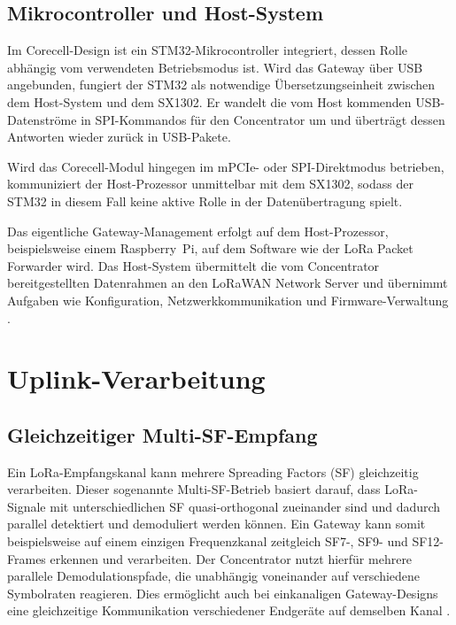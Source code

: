 \subsection{Mikrocontroller und Host-System}
	Im Corecell-Design ist ein STM32-Mikrocontroller integriert, dessen Rolle abhängig vom verwendeten Betriebsmodus ist. Wird das Gateway über USB angebunden, fungiert der STM32 als notwendige Übersetzungseinheit zwischen dem Host-System und dem SX1302. Er wandelt die vom Host kommenden USB-Datenströme in SPI-Kommandos für den Concentrator um und überträgt dessen Antworten wieder zurück in USB-Pakete. 

	Wird das Corecell-Modul hingegen im mPCIe- oder SPI-Direktmodus betrieben, kommuniziert der Host-Prozessor unmittelbar mit dem SX1302, sodass der STM32 in diesem Fall keine aktive Rolle in der Datenübertragung spielt.

	Das eigentliche Gateway-Management erfolgt auf dem Host-Prozessor, beispielsweise einem Raspberry~Pi, auf dem Software wie der LoRa Packet Forwarder wird. Das Host-System übermittelt die vom Concentrator bereitgestellten Datenrahmen an den LoRaWAN Network Server und übernimmt Aufgaben wie Konfiguration, Netzwerkkommunikation und Firmware-Verwaltung \cite{Semtech:2024b}.




\section{Uplink-Verarbeitung}

\subsection{Gleichzeitiger Multi-SF-Empfang}
	Ein LoRa-Empfangskanal kann mehrere Spreading Factors (SF) gleichzeitig verarbeiten. Dieser sogenannte Multi-SF-Betrieb basiert darauf, dass LoRa-Signale mit unterschiedlichen SF quasi-orthogonal zueinander sind und dadurch parallel detektiert und demoduliert werden können. Ein Gateway kann somit beispielsweise auf einem einzigen Frequenzkanal zeitgleich SF7-, SF9- und SF12-Frames erkennen und verarbeiten. Der Concentrator nutzt hierfür mehrere parallele Demodulationspfade, die unabhängig voneinander auf verschiedene Symbolraten reagieren. Dies ermöglicht auch bei einkanaligen Gateway-Designs eine gleichzeitige Kommunikation verschiedener Endgeräte auf demselben Kanal \cite{Semtech:2024b}.

